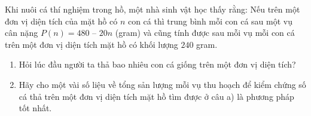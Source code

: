 \begin{bt}%
	Khi nuôi cá thí nghiệm trong hồ, một nhà sinh vật học thấy rằng: Nếu trên một đơn vị diện tích của mặt hồ có $n$ con cá thì trung bình mỗi con cá sau một vụ cân nặng $P(n) = 480$ – $20n$ (gram) và cũng tính được sau mỗi vụ mỗi con cá trên một đơn vị diện tích mặt hồ có khối lượng $240$ gram. 
	\begin{enumerate}
		\item Hỏi lúc đầu người ta thả bao nhiêu con cá giống trên một đơn vị diện tích?
		\item Hãy cho một vài số liệu về tổng sản lượng mỗi vụ thu hoạch để kiểm chứng số cá thả trên một đơn vị diện tích mặt hồ tìm được ở câu a) là phương pháp tốt nhất.
	\end{enumerate}
\end{bt}

